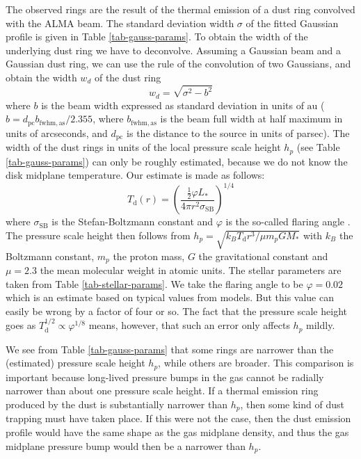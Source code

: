 \documentclass{aa}
\begin{document}
The observed rings are the result of the thermal emission of a dust ring convolved
with the ALMA beam. The standard deviation width $\sigma$ of the fitted Gaussian
profile is given in Table \ref{tab-gauss-params}.  To obtain the width of the
underlying dust ring we have to deconvolve. Assuming a Gaussian beam and a
Gaussian dust ring, we can use the rule of the convolution of two Gaussians, and
obtain the width $w_d$ of the dust ring
\begin{equation}
w_d=\sqrt{\sigma^2-b^2}
\end{equation}
where $b$ is the beam width expressed as standard deviation in units of
$\mathrm{au}$ ($b=d_{\mathrm{pc}}b_{\mathrm{fwhm,as}}/2.355$, where
$b_{\mathrm{fwhm,as}}$ is the beam full width at half maximum in units of
arcseconds, and $d_{\mathrm{pc}}$ is the distance to the source in units of
parsec). The width of the dust rings
in units of the local pressure scale height $h_p$ (see Table
\ref{tab-gauss-params}) can only be roughly estimated, because we do not know
the disk midplane temperature. Our estimate is made as follows:
\begin{equation}\label{eq-disk-temperature-model}
T_{\mathrm{d}}(r) = \left(\frac{\tfrac{1}{2}\varphi L_{*}}{4\pi r^2\sigma_{\mathrm{SB}}}\right)^{1/4}
\end{equation}
where $\sigma_{\mathrm{SB}}$ is the Stefan-Boltzmann constant and $\varphi$ is
the so-called flaring angle \citep[e.g.][]{1997ApJ...490..368C,
  1998ApJ...500..411D, 2001ApJ...560..957D}. The pressure scale height then
follows from $h_p=\sqrt{k_BT_{\mathrm{d}}r^3/\mu m_pGM_{*}}$ with $k_B$ the
Boltzmann constant, $m_p$ the proton mass, $G$ the gravitational constant and
$\mu=2.3$ the mean molecular weight in atomic units. The stellar parameters are
taken from Table \ref{tab-stellar-params}. We take the flaring angle to be
$\varphi=0.02$ which is an estimate based on typical values from models.  But
this value can easily be wrong by a factor of four or so. The fact that the
pressure scale height goes as $T_{\mathrm{d}}^{1/2}\propto \varphi^{1/8}$
means, however, that such an error only affects $h_p$ mildly.

We see from Table \ref{tab-gauss-params} that some rings are narrower than the
(estimated) pressure scale height $h_p$, while others are broader. This
comparison is important because long-lived pressure bumps in the gas cannot be
radially narrower than about one pressure scale height. If a thermal emission
ring produced by the dust is substantially narrower than $h_p$, then some kind
of dust trapping must have taken place. If this were not the case, then the dust
emission profile would have the same shape as the gas midplane density, and thus
the gas midplane pressure bump would then be a narrower than $h_p$. 
\end{document}
